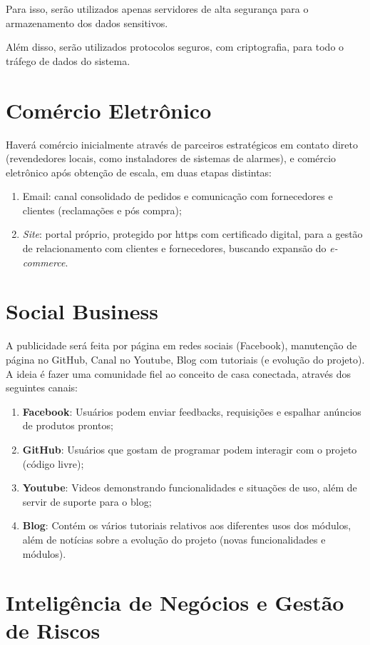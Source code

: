 Para isso, serão utilizados apenas servidores de alta segurança para o armazenamento dos dados sensitivos.

Além disso, serão utilizados protocolos seguros, com criptografia, para todo o tráfego de dados do sistema.

\section{Comércio Eletrônico}

Haverá comércio inicialmente através de parceiros estratégicos em contato direto (revendedores locais, como instaladores de sistemas de alarmes), e comércio eletrônico após obtenção de escala, em duas etapas distintas:
\begin{enumerate}
	\item Email: canal consolidado de pedidos e comunicação com fornecedores e clientes (reclamações e pós compra);
	\item \textit{Site}: portal próprio, protegido por https com certificado digital, para a gestão de relacionamento com clientes e fornecedores, buscando expansão do \textit{e-commerce}. 
\end{enumerate}

\section{Social Business}

A publicidade será feita por página em redes sociais (Facebook), manutenção de página no GitHub, Canal no Youtube, Blog com tutoriais (e evolução do projeto). A ideia é fazer uma comunidade fiel ao conceito de casa conectada, através dos seguintes canais:
\begin{enumerate}
	\item \textbf{Facebook}: Usuários podem enviar feedbacks, requisições e espalhar anúncios de produtos prontos;
	\item \textbf{GitHub}: Usuários que gostam de programar podem interagir com o projeto (código livre);
	\item \textbf{Youtube}: Videos demonstrando funcionalidades e situações de uso, além de servir de suporte para o blog;
	\item \textbf{Blog}: Contém os vários tutoriais relativos aos diferentes usos dos módulos, além de notícias sobre a evolução do projeto (novas funcionalidades e módulos).
\end{enumerate}

\section{Inteligência de Negócios e Gestão de Riscos}

